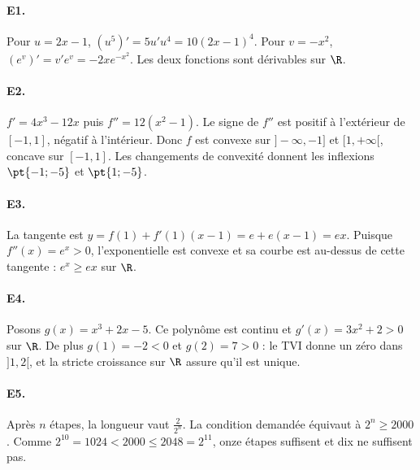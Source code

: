 \paragraph{E1.}Pour $u=2x-1$, $(u^5)'=5u' u^4=10(2x-1)^4$. Pour $v=-x^2$, $(e^v)'=v' e^v=-2xe^{-x^2}$. Les deux fonctions sont dérivables sur $\R$.

\paragraph{E2.}$f'=4x^3-12x$ puis $f''=12(x^2-1)$. Le signe de $f''$ est positif à l'extérieur de $[-1,1]$, négatif à l'intérieur. Donc $f$ est convexe sur $]-\infty,-1]$ et $[1,+\infty[$, concave sur $[-1,1]$. Les changements de convexité donnent les inflexions $\pt{-1;-5}$ et $\pt{1;-5}$.

\paragraph{E3.}La tangente est $y=f(1)+f'(1)(x-1)=e+e(x-1)=ex$. Puisque $f''(x)=e^x>0$, l'exponentielle est convexe et sa courbe est au-dessus de cette tangente : $e^x\ge ex$ sur $\R$.

\paragraph{E4.}Posons $g(x)=x^3+2x-5$. Ce polynôme est continu et $g'(x)=3x^2+2>0$ sur $\R$. De plus $g(1)=-2<0$ et $g(2)=7>0$ : le TVI donne un zéro dans $]1,2[$, et la stricte croissance sur $\R$ assure qu'il est unique.

\paragraph{E5.}Après $n$ étapes, la longueur vaut $\frac{2}{2^n}$. La condition demandée équivaut à $2^n\ge2000$. Comme $2^{10}=1024<2000\le2048=2^{11}$, onze étapes suffisent et dix ne suffisent pas.

